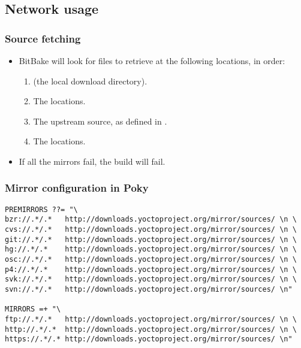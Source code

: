 \subsection{Network usage}

\begin{frame}
  \frametitle{Source fetching}
  \begin{itemize}
    \item BitBake will look for files to retrieve at the following
      locations, in order:
      \begin{enumerate}
        \item {} (the local download directory).
        \item The  locations.
        \item The upstream source, as defined in .
        \item The  locations.
      \end{enumerate}
    \item If all the mirrors fail, the build will fail.
  \end{itemize}
\end{frame}

\begin{frame}[fragile]
  \frametitle{Mirror configuration in Poky}
  \begin{block}{}
    \begin{verbatim}
PREMIRRORS ??= "\
bzr://.*/.*   http://downloads.yoctoproject.org/mirror/sources/ \n \
cvs://.*/.*   http://downloads.yoctoproject.org/mirror/sources/ \n \
git://.*/.*   http://downloads.yoctoproject.org/mirror/sources/ \n \
hg://.*/.*    http://downloads.yoctoproject.org/mirror/sources/ \n \
osc://.*/.*   http://downloads.yoctoproject.org/mirror/sources/ \n \
p4://.*/.*    http://downloads.yoctoproject.org/mirror/sources/ \n \
svk://.*/.*   http://downloads.yoctoproject.org/mirror/sources/ \n \
svn://.*/.*   http://downloads.yoctoproject.org/mirror/sources/ \n"

MIRRORS =+ "\
ftp://.*/.*   http://downloads.yoctoproject.org/mirror/sources/ \n \
http://.*/.*  http://downloads.yoctoproject.org/mirror/sources/ \n \
https://.*/.* http://downloads.yoctoproject.org/mirror/sources/ \n"
    \end{verbatim}
  \end{block}
\end{frame}

